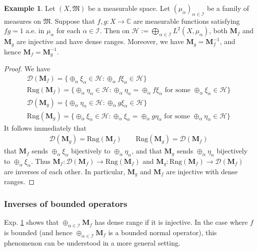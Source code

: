\documentclass[12pt,b5paper,notitlepage]{article}
\theoremstyle{definition}
\newtheorem{eg}[df]{Example}
\theoremstyle{plain}
\newcommand{\fk}{\mathfrak}
\newcommand{\Dom}{\mathscr{D}}
\newcommand{\Cbb}{\mathbb C}
\newcommand{\Rng}{\mathrm{Rng}}
\newcommand{\MH}{\mathcal H}
\newcommand{\SI}{\mathscr I}
\newcommand{\Mbf}{\mathbf M}
\numberwithin{equation}{section}
\begin{document}
\begin{eg}\label{lb373}
Let $(X,\fk M)$ be a measurable space. Let $(\mu_\alpha)_{\alpha\in\SI}$ be a family of measures on $\fk M$. Suppose that $f,g:X\rightarrow\Cbb$ are measurable functions satisfying $fg=1$ a.e. in $\mu_\alpha$ for each $\alpha\in\SI$. Then on $\MH:=\bigoplus_{\alpha\in\SI}L^2(X,\mu_\alpha)$, both $\Mbf_f$ and $\Mbf_g$ are injective and have dense ranges. Moreover, we have $\Mbf_g=\Mbf_f^{-1}$, and hence $\Mbf_f=\Mbf_g^{-1}$.
\end{eg}




\begin{proof}
We have
\begin{gather*}
\Dom(\Mbf_f)=\{\oplus_\alpha\xi_\alpha\in\MH:\oplus_\alpha f\xi_\alpha\in\MH\}\\
\Rng(\Mbf_f)=\{\oplus_\alpha \eta_\alpha\in\MH:\oplus_\alpha \eta_\alpha=\oplus_\alpha f\xi_\alpha\text{ for some }\oplus_\alpha\xi_\alpha\in\MH\}\\
\Dom(\Mbf_g)=\{\oplus_\alpha\eta_\alpha\in\MH:\oplus_\alpha g\xi_\alpha\in\MH\}\\
\Rng(\Mbf_g)=\{\oplus_\alpha \xi_\alpha\in\MH:\oplus_\alpha \xi_\alpha=\oplus_\alpha g\eta_\alpha\text{ for some }\oplus_\alpha\eta_\alpha\in\MH\}
\end{gather*}
It follows immediately that 
\begin{align*}
\Dom(\Mbf_g)=\Rng(\Mbf_f)\qquad \Rng(\Mbf_g)=\Dom(\Mbf_f)
\end{align*}
that $\Mbf_f$ sends $\oplus_\alpha\xi_\alpha$ bijectively to $\oplus_\alpha\eta_\alpha$, and that $\Mbf_g$ sends $\oplus_\alpha\eta_\alpha$ bijectively to $\oplus_\alpha\xi_\alpha$. Thus $\Mbf_f:\Dom(\Mbf_f)\rightarrow\Rng(\Mbf_f)$ and $\Mbf_g:\Rng(\Mbf_f)\rightarrow\Dom(\Mbf_f)$ are inverses of each other. In particular, $\Mbf_g$ and $\Mbf_f$ are injective with dense ranges.
\end{proof}


\subsubsection{Inverses of bounded operators}


Exp. \ref{lb373} shows that $\oplus_{\alpha\in\SI}\Mbf_f$ has dense range if it is injective. In the case where $f$ is bounded (and hence $\oplus_{\alpha\in\SI}\Mbf_f$ is a bounded normal operator), this phenomenon can be understood in a more general setting.
\end{document}
